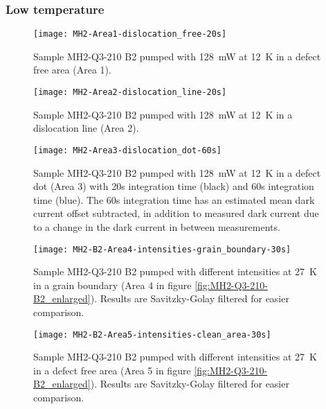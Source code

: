 \subsubsection{Low temperature}

\begin{figure}[H]
\centering
\texttt{[image: MH2-Area1-dislocation\_free-20s]}
\caption[MH2-Q3-210 at area 1]{Sample MH2-Q3-210 B2 pumped with 128~mW at 12~K in a defect free area (Area 1).}
\label{fig:MH2-Area1-dislocation_free-20s}%
\end{figure}

\begin{figure}[H]
\centering
\texttt{[image: MH2-Area2-dislocation\_line-20s]}
\caption[MH2-Q3-210 at area 2]{Sample MH2-Q3-210 B2 pumped with 128~mW at 12~K in a dislocation line (Area 2).}
\label{fig:MH2-Area2-dislocation_line-20s}%
\end{figure}

\begin{figure}[H]
\centering
\texttt{[image: MH2-Area3-dislocation\_dot-60s]}
\caption[MH2-Q3-210 at area 3]{Sample MH2-Q3-210 B2 pumped with 128~mW at 12~K in a defect dot (Area 3) with 20s integration time (black) and 60s integration time (blue). The 60s integration time has an estimated mean dark current offset subtracted, in addition to measured dark current due to a change in the dark current in between measurements.}
\label{fig:MH2-Area3-dislocation_dot-60s}%
\end{figure}


\begin{figure}[H]
\centering
\texttt{[image: MH2-B2-Area4-intensities-grain\_boundary-30s]}
\caption[MH2-Q3-210 at area 4 with different intensities]{Sample MH2-Q3-210 B2 pumped with different intensities at 27~K in a grain boundary (Area 4 in figure \ref{fig:MH2-Q3-210-B2_enlarged}). Results are Savitzky-Golay filtered for easier comparison.}
\label{fig:MH2-B2-Area4-intensities-grain_boundary-30s}%
\end{figure}


\begin{figure}[H]
\centering
\texttt{[image: MH2-B2-Area5-intensities-clean\_area-30s]}
\caption[MH2-Q3-210 at area 5 with different intensities]{Sample MH2-Q3-210 B2 pumped with different intensities at 27~K in a defect free area (Area 5 in figure \ref{fig:MH2-Q3-210-B2_enlarged}). Results are Savitzky-Golay filtered for easier comparison.}
\label{fig:MH2-B2-Area5-intensities-clean_area-30s}%
\end{figure}


